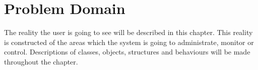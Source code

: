\chapter{Problem Domain}
The reality the user is going to see will be described in this chapter. This reality is constructed of the areas which the system is going to administrate, monitor or control. Descriptions of classes, objects, structures and behaviours will be made throughout the chapter.




